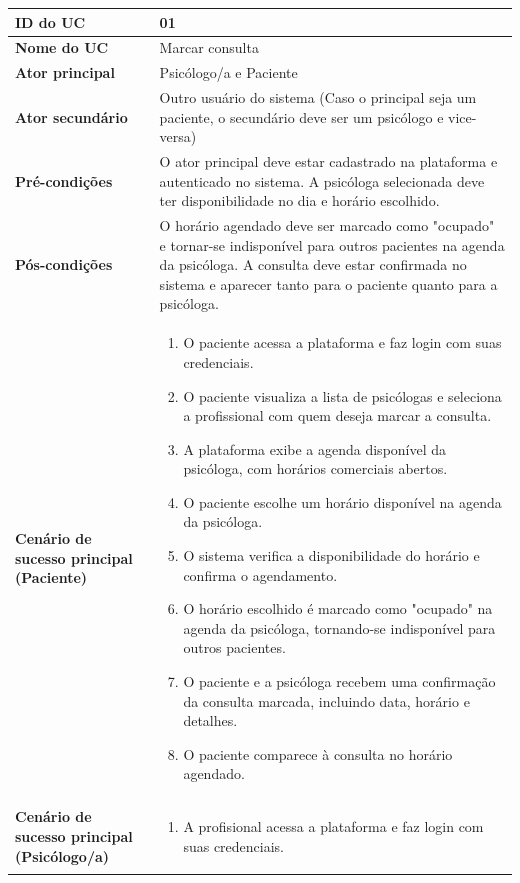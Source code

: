 \documentclass[a4paper,12pt]{report}
\begin{document}
\begin{longtable}{|p{4cm}|p{11.5cm}|}
    \hline
    \textbf{ID do UC} & \textbf{01} \\ \hline
    \textbf{Nome do UC} & Marcar consulta  \\ \hline
    \textbf{Ator principal} & Psicólogo/a e Paciente \\ \hline
    \textbf{Ator secundário} & Outro usuário do sistema (Caso o principal seja um paciente, o
secundário deve ser um psicólogo e vice-versa) \\ \hline
    \textbf{Pré-condições} & O ator principal deve estar cadastrado na plataforma e autenticado no sistema. A psicóloga selecionada deve ter disponibilidade no dia e horário escolhido. \\ \hline
    \textbf{Pós-condições} & O horário agendado deve ser marcado como "ocupado" e tornar-se indisponível para outros pacientes na agenda da psicóloga. A consulta deve estar confirmada no sistema e aparecer tanto para o paciente quanto para a psicóloga. \\ \hline
    \textbf{Cenário de sucesso principal (Paciente)} & 
    \begin{enumerate}[left=2mm]
        \item O paciente acessa a plataforma e faz login com suas credenciais.
        \item O paciente visualiza a lista de psicólogas e seleciona a profissional com quem deseja marcar a consulta.
        \item A plataforma exibe a agenda disponível da psicóloga, com horários comerciais abertos.
        \item O paciente escolhe um horário disponível na agenda da psicóloga.
        \item O sistema verifica a disponibilidade do horário e confirma o agendamento.
        \item O horário escolhido é marcado como "ocupado" na agenda da psicóloga, tornando-se indisponível para outros pacientes.
        \item O paciente e a psicóloga recebem uma confirmação da consulta marcada, incluindo data, horário e detalhes.
        \item O paciente comparece à consulta no horário agendado.
    \end{enumerate} \\ \hline
        \textbf{Cenário de sucesso principal (Psicólogo/a)} & 
    \begin{enumerate}[left=2mm]
        \item A profisional acessa a plataforma e faz login com suas credenciais.

\end{enumerate}
\end{longtable}
\end{document}
